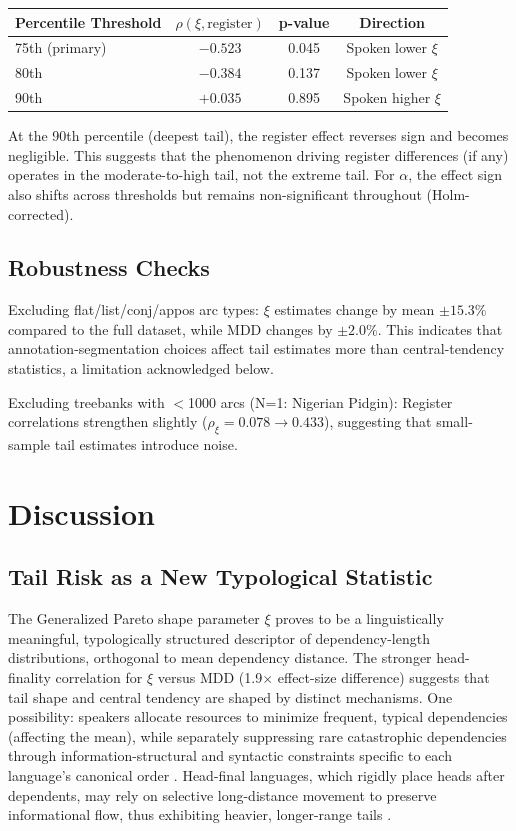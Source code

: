 \documentclass[11pt,letterpaper]{article}
\begin{document}
\begin{center}
\begin{tabular}{lccc}
\toprule
Percentile Threshold & $\rho(\xi, \text{register})$ & p-value & Direction \\
\midrule
75th (primary) & $-0.523$ & 0.045 & Spoken lower $\xi$ \\
80th & $-0.384$ & 0.137 & Spoken lower $\xi$ \\
90th & $+0.035$ & 0.895 & Spoken higher $\xi$ \\
\bottomrule
\end{tabular}
\end{center}

At the 90th percentile (deepest tail), the register effect reverses sign and becomes negligible. This suggests that the phenomenon driving register differences (if any) operates in the moderate-to-high tail, not the extreme tail. For $\alpha$, the effect sign also shifts across thresholds but remains non-significant throughout (Holm-corrected).

\subsection{Robustness Checks}

Excluding flat/list/conj/appos arc types: $\xi$ estimates change by mean $\pm 15.3\%$ compared to the full dataset, while MDD changes by $\pm 2.0\%$. This indicates that annotation-segmentation choices affect tail estimates more than central-tendency statistics, a limitation acknowledged below.

Excluding treebanks with $<$1000 arcs (N=1: Nigerian Pidgin): Register correlations strengthen slightly ($\rho_\xi = 0.078 \rightarrow 0.433$), suggesting that small-sample tail estimates introduce noise.

\section{Discussion}

\subsection{Tail Risk as a New Typological Statistic}

The Generalized Pareto shape parameter $\xi$ proves to be a linguistically meaningful, typologically structured descriptor of dependency-length distributions, orthogonal to mean dependency distance. The stronger head-finality correlation for $\xi$ versus MDD (1.9$\times$ effect-size difference) suggests that tail shape and central tendency are shaped by distinct mechanisms. One possibility: speakers allocate resources to minimize frequent, typical dependencies (affecting the mean), while separately suppressing rare catastrophic dependencies through information-structural and syntactic constraints specific to each language's canonical order \citep{Hawkins1994}. Head-final languages, which rigidly place heads after dependents, may rely on selective long-distance movement to preserve informational flow, thus exhibiting heavier, longer-range tails \citep{Gildea2010}.
\end{document}

